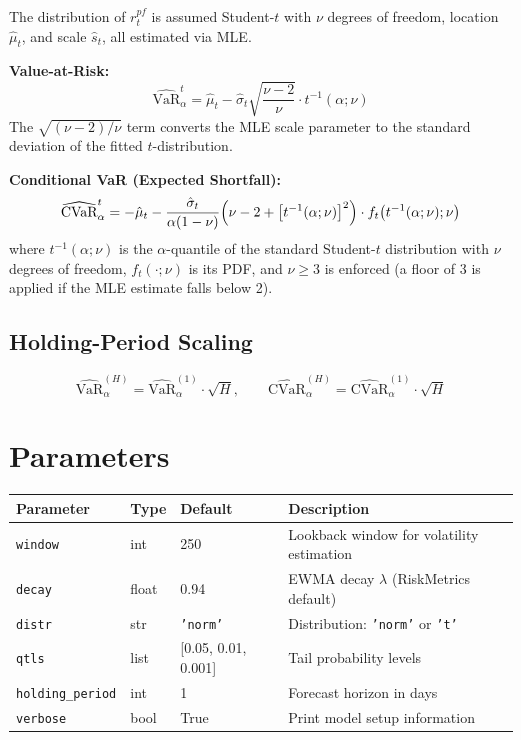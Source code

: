 \documentclass[11pt, a4paper]{article}
\begin{document}
The distribution of $r_t^{pf}$ is assumed Student-$t$ with $\nu$ degrees of freedom,
location $\hat{\mu}_t$, and scale $\hat{s}_t$, all estimated via MLE.

\textbf{Value-at-Risk:}
\begin{equation}
\widehat{\text{VaR}}_\alpha^{t}
= \hat{\mu}_t - \hat{\sigma}_t \sqrt{\frac{\nu - 2}{\nu}} \cdot t^{-1}(\alpha;\nu)
\label{eq:ewma_var_t}
\end{equation}
The $\sqrt{(\nu-2)/\nu}$ term converts the MLE scale parameter to the
standard deviation of the fitted $t$-distribution.

\textbf{Conditional VaR (Expected Shortfall):}
\begin{equation}
\widehat{\text{CVaR}}_\alpha^{t}
= -\hat{\mu}_t - \frac{\hat{\sigma}_t}{\alpha(1-\nu)}
  \Bigl(\nu - 2 + \bigl[t^{-1}(\alpha;\nu)\bigr]^2\Bigr)
  \cdot f_t\!\left(t^{-1}(\alpha;\nu);\nu\right)
\label{eq:ewma_cvar_t}
\end{equation}
where $t^{-1}(\alpha;\nu)$ is the $\alpha$-quantile of the standard
Student-$t$ distribution with $\nu$ degrees of freedom, $f_t(\cdot;\nu)$
is its PDF, and $\nu \geq 3$ is enforced (a floor of 3 is applied if the
MLE estimate falls below 2).

\subsection{Holding-Period Scaling}

\begin{equation}
\widehat{\text{VaR}}_\alpha^{(H)} = \widehat{\text{VaR}}_\alpha^{(1)} \cdot \sqrt{H},
\qquad
\widehat{\text{CVaR}}_\alpha^{(H)} = \widehat{\text{CVaR}}_\alpha^{(1)} \cdot \sqrt{H}
\end{equation}

\section{Parameters}

\begin{tabular}{llll}
\toprule
Parameter & Type & Default & Description \\
\midrule
\texttt{window}  & int   & 250   & Lookback window for volatility estimation \\
\texttt{decay}   & float & 0.94  & EWMA decay $\lambda$ (RiskMetrics default) \\
\texttt{distr}   & str   & \texttt{'norm'} & Distribution: \texttt{'norm'} or \texttt{'t'} \\
\texttt{qtls}    & list  & [0.05, 0.01, 0.001] & Tail probability levels \\
\texttt{holding\_period} & int & 1 & Forecast horizon in days \\
\texttt{verbose} & bool  & True  & Print model setup information \\
\bottomrule
\end{tabular}
\end{document}
